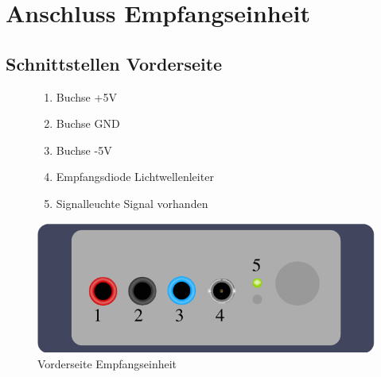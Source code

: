 \documentclass[10pt,a4paper]{scrartcl}
\begin{document}
\section{Anschluss Empfangseinheit}
\subsection{Schnittstellen Vorderseite}
\begin{figure}[H]
\begin{minipage}[t]{6cm}
\vspace{0pt}
\begin{enumerate}
\item Buchse +5V
\item Buchse GND
\item Buchse -5V
\item Empfangsdiode Lichtwellenleiter
\item Signalleuchte Signal vorhanden
\end{enumerate}
\centering
\end{minipage}
\hfill
\begin{minipage}[t]{6.5cm}
\vspace{0pt}
\includegraphics[scale=0.7]{gfx/rx-front.pdf}
\caption{Vorderseite Empfangseinheit}
\label{fig:Bild3}
\end{minipage}
\end{figure}
\end{document}

